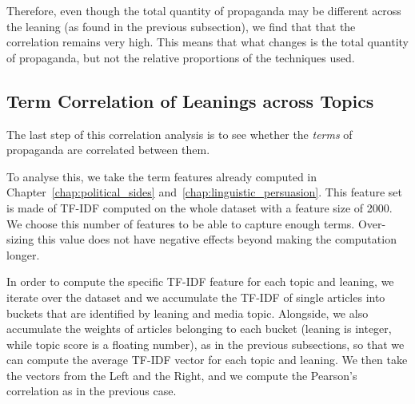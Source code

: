 Therefore, even though the total quantity of propaganda may be different across the leaning (as found in the previous subsection), we find that that the correlation remains very high.
This means that what changes is the total quantity of propaganda, but not the relative proportions of the techniques used.

\subsection{\statusgreen Term Correlation of Leanings across Topics}
\label{ssec:topic_propaganda_leaning_terms}

The last step of this correlation analysis is to see whether the \emph{terms} of propaganda are correlated between them.

To analyse this, we take the term features already computed in Chapter~\ref{chap:political_sides} and~\ref{chap:linguistic_persuasion}.
This feature set is made of TF-IDF computed on the whole dataset with a feature size of 2000.
We choose this number of features to be able to capture enough terms. Over-sizing this value does not have negative effects beyond making the computation longer.

In order to compute the specific TF-IDF feature for each topic and leaning, we iterate over the dataset and we accumulate the TF-IDF of single articles into buckets that are identified by leaning and media topic.
Alongside, we also accumulate the weights of articles belonging to each bucket (leaning is integer, while topic score is a floating number), as in the previous subsections, so that we can compute the average TF-IDF vector for each topic and leaning.
We then take the vectors from the Left and the Right, and we compute the Pearson's correlation as in the previous case.

